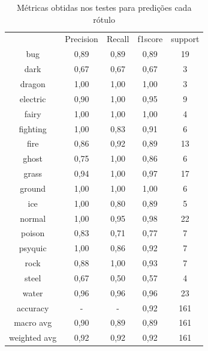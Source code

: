 \documentclass[12pt]{article}
\begin{document}
\begin{table}[H]
    \centering
    \caption{Métricas obtidas nos testes para predições cada rótulo}
    \label{tab:exampleTab3}
    \begin{tabular}{c|c|c|c|c}
                    &   Precision &  Recall   & f1score   & support\\ 
        bug         &      0,89   &   0,89    &  0,89     &   19\\
        dark        &      0,67   &   0,67    &  0,67     &    3\\
        dragon      &      1,00   &   1,00    &  1,00     &    3\\
        electric    &      0,90   &   1,00    &  0,95     &    9\\
        fairy       &      1,00   &   1,00    &  1,00     &    4\\
        fighting    &      1,00   &   0,83    &  0,91     &    6\\
        fire        &      0,86   &   0,92    &  0,89     &   13\\
        ghost       &      0,75   &   1,00    &  0,86     &    6\\
        grass       &      0,94   &   1,00    &  0,97     &   17\\
        ground      &      1,00   &   1,00    &  1,00     &    6\\
        ice         &      1,00   &   0,80    &  0,89     &    5\\
        normal      &      1,00   &   0,95    &  0,98     &   22\\
        poison      &      0,83   &   0,71    &  0,77     &    7\\
        psyquic     &      1,00   &   0,86    &  0,92     &    7\\
        rock        &      0,88   &   1,00    &  0,93     &    7\\
        steel       &      0,67   &   0,50    &  0,57     &    4\\\vspace{0.5cm}
        water       &      0,96   &   0,96    &  0,96     &   23\\
        accuracy    &        -    &     -     &  0,92     &  161\\
        macro avg   &      0,90   &   0,89    &  0,89     &  161\\
        weighted avg &     0,92   &   0,92    &  0,92     &  161
    \end{tabular}
\end{table}
\end{document}
